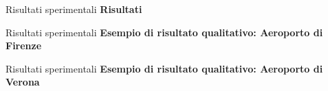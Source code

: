 \documentclass[10pt]{beamer}
\begin{document}
\begin{frame}{Risultati sperimentali}
\textbf{Risultati}

\begin{table}
\centering
{}
\end{table}

\end{frame}

\begin{frame}{Risultati sperimentali}
\textbf{Esempio di risultato qualitativo: Aeroporto di Firenze}
\begin{figure}
	\centering
\end{figure}
\end{frame}

\begin{frame}{Risultati sperimentali}
\textbf{Esempio di risultato qualitativo: Aeroporto di Verona}
\begin{figure}
	\centering
\end{figure}
\end{frame}
\end{document}
